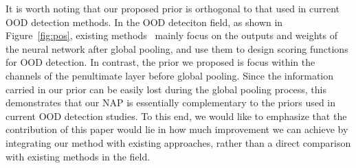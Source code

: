 
It is worth noting that our proposed prior is orthogonal to that used in current OOD detection methods. In the OOD deteciton field, as shown in Figure~\ref{fig:pos}, existing methods~\cite{hendrycks2016msp,sun2022knn,liu2020energy,liang2018odin_confi,lee2018maha_dist,sun2022dice,djurisic2022extremely,ahn2023line,sun2021react} mainly focus on the outputs and weights of the neural network after global pooling, and use them to design scoring functions for OOD detection. In contrast, the prior we proposed is focus within the channels of the penultimate layer before global pooling. Since the information carried in our prior can be easily lost during the global pooling process, this demonstrates that our NAP  is essentially complementary to the priors used in current OOD detection studies. To this end, we would like to emphasize that the contribution of this paper would lie in how much improvement we can achieve by integrating our method with  existing approaches, rather than a direct comparison with existing methods in the field.


